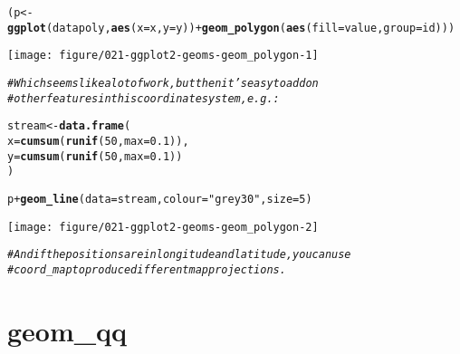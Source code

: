 \documentclass[a4paper,titlepage]{tufte-handout}\usepackage[]{graphicx}\usepackage[]{color}
\makeatletter
\def\maxwidth{ %
  \ifdim\Gin@nat@width>\linewidth
    \linewidth
  \else
    \Gin@nat@width
  \fi
}
\newcommand{\hlnum}[1]{\textcolor[rgb]{0.686,0.059,0.569}{#1}}%
\newcommand{\hlstr}[1]{\textcolor[rgb]{0.192,0.494,0.8}{#1}}%
\newcommand{\hlcom}[1]{\textcolor[rgb]{0.678,0.584,0.686}{\textit{#1}}}%
\newcommand{\hlopt}[1]{\textcolor[rgb]{0,0,0}{#1}}%
\newcommand{\hlstd}[1]{\textcolor[rgb]{0.345,0.345,0.345}{#1}}%
\newcommand{\hlkwb}[1]{\textcolor[rgb]{0.69,0.353,0.396}{#1}}%
\newcommand{\hlkwc}[1]{\textcolor[rgb]{0.333,0.667,0.333}{#1}}%
\newcommand{\hlkwd}[1]{\textcolor[rgb]{0.737,0.353,0.396}{\textbf{#1}}}%
\newenvironment{kframe}{%
 \def\at@end@of@kframe{}%
 \ifinner\ifhmode%
  \def\at@end@of@kframe{\end{minipage}}%
  \begin{minipage}{\columnwidth}%
 \fi\fi%
 \def\FrameCommand##1{\hskip\@totalleftmargin \hskip-\fboxsep
 \colorbox{shadecolor}{##1}\hskip-\fboxsep
     \hskip-\linewidth \hskip-\@totalleftmargin \hskip\columnwidth}%
 \MakeFramed {\advance\hsize-\width
   \@totalleftmargin\z@ \linewidth\hsize
   \@setminipage}}%
 {\par\unskip\endMakeFramed%
 \at@end@of@kframe}
\newenvironment{knitrout}{}{} %
\makeatother
\begin{document}
\begin{knitrout}
\begin{kframe}
\begin{alltt}
\hlstd{(p} \hlkwb{<-} \hlkwd{ggplot}\hlstd{(datapoly,} \hlkwd{aes}\hlstd{(}\hlkwc{x}\hlstd{=x,} \hlkwc{y}\hlstd{=y))} \hlopt{+} \hlkwd{geom_polygon}\hlstd{(}\hlkwd{aes}\hlstd{(}\hlkwc{fill}\hlstd{=value,} \hlkwc{group}\hlstd{=id)))}
\end{alltt}
\end{kframe}
\texttt{[image: figure/021-ggplot2-geoms-geom\_polygon-1]} 
\begin{kframe}\begin{alltt}
\hlcom{# Which seems like a lot of work, but then it's easy to add on}
\hlcom{# other features in this coordinate system, e.g.:}

\hlstd{stream} \hlkwb{<-} \hlkwd{data.frame}\hlstd{(}
  \hlkwc{x} \hlstd{=} \hlkwd{cumsum}\hlstd{(}\hlkwd{runif}\hlstd{(}\hlnum{50}\hlstd{,} \hlkwc{max} \hlstd{=} \hlnum{0.1}\hlstd{)),}
  \hlkwc{y} \hlstd{=} \hlkwd{cumsum}\hlstd{(}\hlkwd{runif}\hlstd{(}\hlnum{50}\hlstd{,}\hlkwc{max} \hlstd{=} \hlnum{0.1}\hlstd{))}
\hlstd{)}

\hlstd{p} \hlopt{+} \hlkwd{geom_line}\hlstd{(}\hlkwc{data} \hlstd{= stream,} \hlkwc{colour}\hlstd{=}\hlstr{"grey30"}\hlstd{,} \hlkwc{size} \hlstd{=} \hlnum{5}\hlstd{)}
\end{alltt}
\end{kframe}
\texttt{[image: figure/021-ggplot2-geoms-geom\_polygon-2]} 
\begin{kframe}\begin{alltt}
\hlcom{# And if the positions are in longitude and latitude, you can use}
\hlcom{# coord_map to produce different map projections.}
\end{alltt}
\end{kframe}
\end{knitrout}


\section{geom\_qq}
\end{document}
